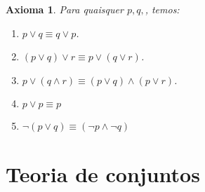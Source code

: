 \documentclass{article}
\theoremstyle{plain}
\newtheorem{axioma}{Axioma}
\theoremstyle{definition}
\theoremstyle{remark}
\begin{document}
\begin{axioma}
	Para quaisquer $p,q,$, temos:
	\begin{enumerate}
		\item $p \lor q \equiv q\lor p$.
		\item $(p \lor q) \lor r \equiv p \lor (q\lor r)$.
		\item $p\lor (q \land r)  \equiv (p\lor q) \land (p\lor r)$.
		\item $p\lor p \equiv p$
		\item $\neg (p\lor q)  \equiv (\neg p \land \neg q)$
	\end{enumerate}
\end{axioma}
\section{Teoria de conjuntos}
\end{document}
